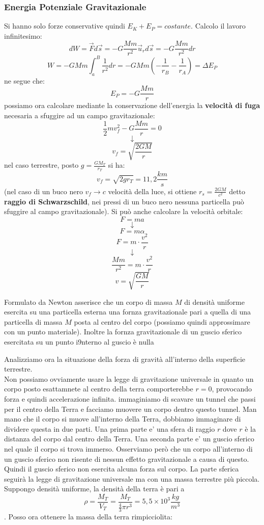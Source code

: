 \documentclass[a4paper,12pt, oneside]{book}
\begin{document}
\subsubsection{Energia Potenziale Gravitazionale}
Si hanno solo forze conservative quindi $E_K+E_P=costante$. Calcolo il lavoro infinitesimo:
$$dW=\vec{F}d\vec{s}=-G\frac{Mm}{r^2}\vec{u}_rd\vec{s}=-G\frac{Mm}{r^2}dr$$
$$W=-GMm\int_a^B\frac{1}{r^2}dr=-GMm\left(-\frac{1}{r_B}-\frac{1}{r_A}\right)=\Delta E_P$$
ne segue che:
$$E_P=-G\frac{Mm}{r}$$
possiamo ora calcolare mediante la conservazione dell'energia la \textbf{velocità di fuga} necesaria a sfuggire ad un campo gravitazionale:
$$\frac{1}{2}mv_f^2-G\frac{Mm}{r}=0$$
$$\downarrow$$
$$v_f=\sqrt{\frac{2GM}{r}}$$
nel caso terrestre, posto $g=\frac{G M_T}{r_T}$
si ha:
$$v_f=\sqrt{2gr_T}=11,2\frac{km}{s}$$
(nel caso di un buco nero $v_f\to c$ velocità della luce, si ottiene $r_s=\frac{2GM}{c^2}$ detto \textbf{raggio di Schwarzschild}, nei pressi di un buco nero nessuna particella può sfuggire al campo gravitazionale).
Si può anche calcolare la velocità orbitale:
$$F=ma$$
$$\downarrow$$
$$F=m\alpha$$
$$F=m\cdot \frac{v^2}{r}$$
$$\downarrow$$
$$\frac{Mm}{r^2}=m\cdot \frac{v^2}{r}$$
$$v=\sqrt{\frac{GM}{r}}$$
\begin{teorema}
	Formulato da Newton asserisce che un corpo di massa $M$ di densità uniforme esercita su una particella esterna una fornza gravitazionale pari a quella di una particella di massa $M$ posta al centro del corpo (possiamo quindi approssimare con un punto materiale). Inoltre la fornza gravitazionale di un guscio sferico esercitata su un punto i9nterno al guscio è nulla
\end{teorema}
Analizziamo ora la situazione della forza di gravità all'interno della superficie terrestre.\\
Non possiamo ovviamente usare la legge di gravitazione universale in quanto un corpo posto esattamnete al centro della terra comporterebbe $r=0$, provocando forza e quindi accelerazione infinita. immaginiamo di scavare un tunnel che passi per il centro  della Terra e facciamo muovere un corpo dentro questo tunnel. Man mano  che il corpo si muove all'interno della Terra, dobbiamo immaginare di  dividere questa in due parti. Una prima parte e' una sfera di raggio $r$ dove $r$ è la distanza del corpo dal centro della Terra. Una seconda  parte  e' un guscio sferico nel quale il corpo si trova immerso. Osserviamo   però che un corpo all'interno di un  guscio sferico non risente di  nessun effetto gravitazionale a causa di questo. Quindi il guscio  sferico non esercita  alcuna forza sul corpo. La parte sferica seguirà la legge di gravitazione universale ma con una massa terrestre più piccola. Suppongo densità uniforme, la densità della terra è pari a $$\rho=\frac{M_T}{V_T}=\frac{M_T}{\frac{4}{3}\pi r^3}=5,5\times 10^3 \frac{kg}{m^3}$$. Posso ora ottenere la  massa della terra rimpicciolita:
\end{document}
